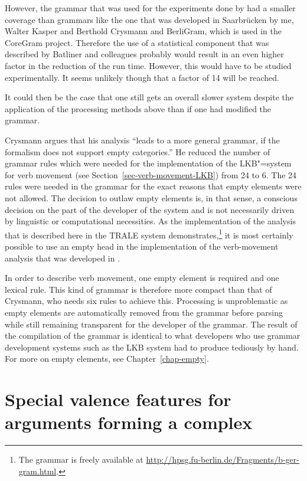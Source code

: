 \begin{exe}
\begin{xlist}
{        However, the grammar that was used for the experiments done by  had a
        smaller coverage than grammars like the one that was developed in Saarbrücken by me, Walter
        Kasper and Berthold Crysmann and BerliGram, which is used in the CoreGram project. Therefore
        the use of a statistical component that was described by Batliner and colleagues probably
        would result in an even higher factor in the reduction of the run time. However, this would
        have to be studied experimentally. It seems unlikely though that a factor of 14 will be reached.
	
	It could then be the case that one still gets an overall slower system despite the application of the processing
	methods above than if one had modified the grammar.
}

Crysmann argues that his analysis ``leads to a more general grammar, if the
formalism does not support empty categories.'' He reduced the number of grammar rules which were needed for the
implementation of the LKB"=system \citep{Copestake2002a} for verb movement (see Section~\ref{sec-verb-movement-LKB}) from 24 to 6.
The 24 rules were needed in the grammar for the exact reasons that empty elements were not allowed. The decision
to outlaw empty elements is, in that sense, a conscious decision on the part of the developer of the system and
is not necessarily driven by linguistic or computational necessities. As the implementation of the
analysis that is described here
in the TRALE system \citep*{MPR2002a-u,Penn2004a-u} demonstrates,\footnote{
        The grammar is freely available at \url{http://hpsg.fu-berlin.de/Fragments/b-ger-gram.html}.
        } it is most certainly possible to use an empty
head in the implementation of the verb-movement analysis that was developed in \verbmobil.

In order to describe verb movement, one empty element is required and one lexical rule. This kind of
grammar is therefore more compact than that of Crysmann, who needs six rules to achieve
this. Processing is unproblematic as empty elements are automatically removed from the grammar
before parsing while still remaining transparent for the developer of the grammar. The result of the
compilation of the grammar is identical to what developers who use grammar development systems such
as the LKB system had to produce tediously by hand. For more on empty elements, see
Chapter~\ref{chap-empty}.



\section{Special valence features for arguments forming a complex}


\end{xlist}
\end{exe}
